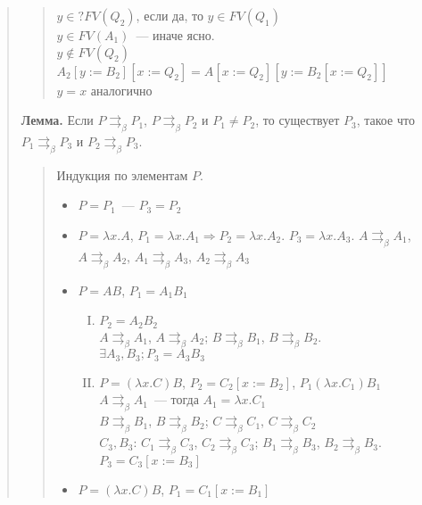 \documentclass{article}
\begin{document}
\begin{quote}
\begin{quote}
\begin{itemize}
\begin{itemize}
					$y \in ? FV(Q_2)$, если да, то $y \in FV(Q_1)$ \\
					$y \in FV(A_1)$~--- иначе ясно. \\
					$y \not\in FV(Q_2)$ \\
					$A_2 [y := B_2][x := Q_2] = A [x := Q_2][y := B_2 [x := Q_2]]$ \\
					$y = x$ аналогично
				\end{itemize}
			\end{itemize}
		\end{quote}
		\textbf{Лемма.} Если $P \rightrightarrows_{\beta} P_1$, $P \rightrightarrows_{\beta} P_2$ и $P_1 \not= P_2$, то существует $P_3$, такое что $P_1 \rightrightarrows_{\beta} P_3$ и $P_2 \rightrightarrows_{\beta} P_3$.
		\begin{quote}
			Индукция по элементам $P$.
			\begin{itemize}
				\item $P = P_1$~--- $P_3 = P_2$
				\item $P = \lambda x. A$, $P_1 = \lambda x. A_1 \Rightarrow P_2 = \lambda x. A_2$. $P_3 = \lambda x. A_3$. $A \rightrightarrows_{\beta} A_1$, $A \rightrightarrows_{\beta} A_2$, $A_1 \rightrightarrows_{\beta} A_3$, $A_2 \rightrightarrows_{\beta} A_3$
				\item $P = AB$, $P_1 = A_1B_1$
				\begin{enumerate}[(I)]
					\item $P_2 = A_2B_2$ \\
					$A \rightrightarrows_{\beta} A_1$, $A \rightrightarrows_{\beta} A_2$; $B \rightrightarrows_{\beta} B_1$, $B \rightrightarrows_{\beta} B_2$. \\
					$\exists A_3, B_3; P_3 = A_3B_3$
					\item $P = (\lambda x. C)B$, $P_2 = C_2 [x := B_2]$, $P_1 (\lambda x. C_1) B_1$ \\
					$A \rightrightarrows_{\beta} A_1$~--- тогда $A_1 = \lambda x. C_1$ \\
					$B \rightrightarrows_{\beta} B_1$, $B \rightrightarrows_{\beta} B_2$; $C \rightrightarrows_{\beta} C_1$, $C \rightrightarrows_{\beta} C_2$ \\
					$C_3, B_3$: $C_1 \rightrightarrows_{\beta} C_3$, $C_2 \rightrightarrows_{\beta} C_3$; $B_1 \rightrightarrows_{\beta} B_3$, $B_2 \rightrightarrows_{\beta} B_3$. $P_3 = C_3 [x := B_3]$
				\end{enumerate}
				\item $P = (\lambda x. C)B$, $P_1 = C_1 [x := B_1]$
				\begin{enumerate}[(I)]

\end{enumerate}
\end{itemize}
\end{quote}
\end{quote}
\end{document}

